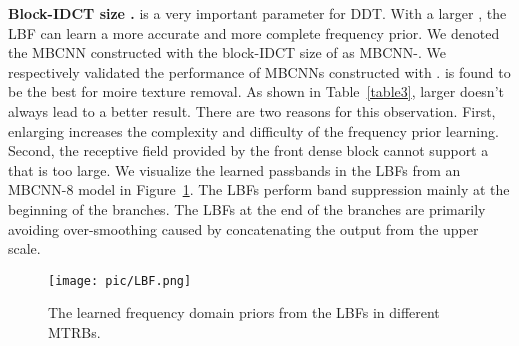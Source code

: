 \documentclass[10pt,twocolumn,letterpaper]{article}
\begin{document}
\textbf{Block-IDCT size .}
 is a very important parameter for DDT. With a larger , the LBF can learn a more accurate and more complete frequency prior. 
We denoted the MBCNN constructed with the block-IDCT size of  as MBCNN-. 
We respectively validated the performance of MBCNNs constructed with .  is found to be the best for moire texture removal. 
As shown in Table~\ref{table3}, larger  doesn't always lead to a better result. 
There are two reasons for this observation. First, enlarging  increases the complexity and difficulty of the frequency prior learning. 
Second, the receptive field provided by the front dense block cannot support a  that is too large. 
We visualize the learned passbands in the LBFs from an MBCNN-8 model in Figure~\ref{passbands}. 
The LBFs perform band suppression mainly at the beginning of the branches.
The LBFs at the end of the branches are primarily avoiding over-smoothing caused by concatenating the output from the upper scale.
\begin{figure}[t]
	\centering
	\texttt{[image: pic/LBF.png]}
	\caption{The learned frequency domain priors from the LBFs in different MTRBs.}
	\label{passbands}
\end{figure}
\end{document}
